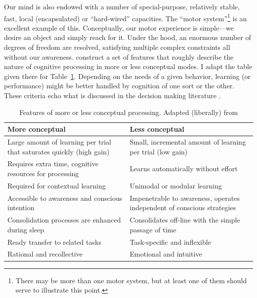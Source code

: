 Our mind is also endowed with a number of special-purpose, relatively stable,
fast, local (encapsulated) or ``hard-wired'' capacities. The ``motor
system''\footnote{There may be more than one motor system, but at least one of
them should serve to illustrate this point.} is an excellent example of this.
Conceptually, our motor experience is simple---we desire an object and simply
reach for it. Under the hood, an enormous number of degrees of freedom are
resolved, satisfying multiple complex constraints all without our awareness.
\citeauthor{clark_multiple_2010} construct a set of features that roughly describe
the nature of cognitive processing in more or less conceptual modes. I adapt the
table given there for Table~\ref{table:multiple}.  Depending on the needs of a
given behavior, learning (or performance) might be better handled by cognition
of one sort or the other. These criteria echo what is discussed in the decision
making literature \cite{kahneman_perspective_2003}.

\begin{table}
\centering
\begin{tabular}{p{}p{}}
\textbf{More conceptual} & \textbf{Less conceptual} \\ \hline \hline

Large amount of learning per trial that saturates quickly (high gain) &
Small, incremental amount of learning per trial (low gain) \\
\hline

Requires extra time, cognitive resources for processing &
Learns automatically without effort \\
\hline

Required for contextual learning &
Unimodal or modular learning \\
\hline

Accessible to awareness and conscious intention &
Impenetrable to awareness, operates independent of conscious strategies \\
\hline

Consolidation processes are enhanced during sleep &
Consolidates off-line with the simple passage of time \\
\hline

Ready transfer to related tasks &
Task-specific and inflexible \\
\hline

Rational and recollective &
Emotional and intuitive \\
\hline
\end{tabular}
\caption{Features of more or less conceptual processing. Adapted (liberally) from
\protect \citeauthor{clark_multiple_2010}} 
\label{table:multiple}
\end{table}

